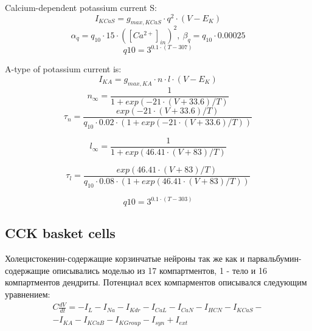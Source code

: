 \documentclass[a4paper,12pt]{article}
\begin{document}
Calcium-dependent potassium current S:
\begin{equation}
\label{eq:KvCaS}
I_{KCaS} = g_{max, KCaS} \cdot q^2 \cdot (V - E_K)
\end{equation}
\begin{equation}
\alpha_q = q_{10} \cdot 15 \cdot ([Ca^{2+}]_{in})^2 , \  \beta_q = q_{10} \cdot 0.00025
\end{equation}
\begin{equation}
q10 = 3^{0.1\cdot (T - 307) } 
\end{equation}

A-type of potassium current is:
\begin{equation}
\label{eq:KvA}
I_{KA} = g_{max, KA} \cdot n \cdot l \cdot (V - E_K)
\end{equation}
\begin{equation}
n_{\infty} = \frac{1}{1 + exp(-21 \cdot (V + 33.6)/T)}
\end{equation}
\begin{equation}
\tau_n = \frac{exp(-21 \cdot (V + 33.6)/T) }
{q_{10} \cdot 0.02 \cdot (1 + exp(-21 \cdot (V + 33.6)/T))}
\end{equation}

\begin{equation}
l_{\infty} = \frac{1}{1 + exp(46.41 \cdot  (V + 83)/T)}
\end{equation}

\begin{equation}
\tau_l = \frac{exp(46.41 \cdot  (V + 83)/T) }
{q_{10} \cdot 0.08 \cdot (1 + exp(46.41 \cdot  (V + 83)/T))}
\end{equation}

\begin{equation}
q10 = 3^{0.1\cdot (T - 303) } 
\end{equation}


\subsection{CCK basket cells}
Холецистокенин-содержащие корзинчатые нейроны так же как и парвальбумин-содержащие описывались моделью из 17 компартментов, 1 - тело и 16 компартментов дендриты. Потенциал всех компарментов описывался следующим уравнением:
\begin{eqnarray}
C\frac{dV}{dt}=-I_L-I_{Na}-I_{Kdr}-I_{CaL}-I_{CaN}-I_{HCN}-I_{KCaS}- \nonumber \\
-I_{KA}-I_{KCaB}-I_{KGroup}-I_{syn} + I_{ext}
\end{eqnarray}
\end{document}
